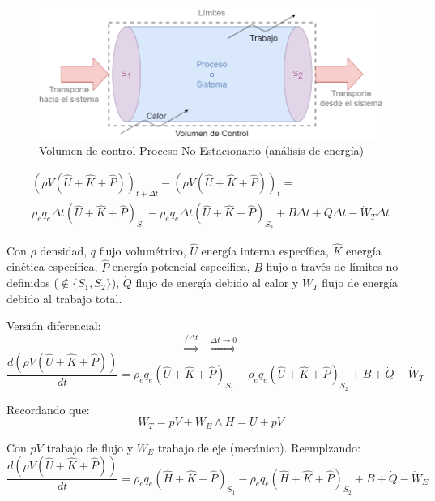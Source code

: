     \begin{figure}
        \centering
        \includegraphics[width=.73\textwidth]{img/esquemas/balance_energia_ns.png}
        \caption{Volumen de control Proceso No Estacionario (análisis de energía)}
        \label{fig:vol_control_en_n_s}
    \end{figure}
    \begin{equation}
    \label{eq:be_no_s}
        \begin{matrix}
             \left ( \rho V \left ( \widehat{U} +\widehat{K} + \widehat{P} \right ) \right )_{t + \Delta t} - \left ( \rho V \left ( \widehat{U} +\widehat{K} + \widehat{P} \right ) \right )_{t} = \\
             \rho_{e} q_{e} \Delta t \left ( \widehat{U} +\widehat{K} + \widehat{P} \right )_{S_{1}} - \rho_{e} q_{e} \Delta t \left ( \widehat{U} +\widehat{K} + \widehat{P} \right )_{S_{2}} + B \Delta t + \dot{Q} \Delta t - \dot{W}_{T} \Delta t
        \end{matrix}
    \end{equation}
    
    Con \(\rho\) densidad, \(q\) flujo volumétrico, \(\widehat{U}\) energía interna específica, \(\widehat{K}\) energía cinética específica, \(\widehat{P}\) energía potencial específica, \(B\) flujo a través de límites no definidos (\(\notin \{ S_{1}, S_{2} \} \)), \(\dot{Q}\) flujo de energía debido al calor y \(\dot{W}_{T}\) flujo de energía debido al trabajo total.
    
    Versión diferencial:
    \[\overset{/\Delta t}{\Rightarrow}\;\;\overset{\Delta t \rightarrow 0}{\Rightarrow}\]
    \[\frac{d \left ( \rho V \left ( \widehat{U} +\widehat{K} + \widehat{P} \right ) \right )}{dt} = \rho_{e} q_{e} \left ( \widehat{U} +\widehat{K} + \widehat{P} \right )_{S_{1}} - \rho_{e} q_{e} \left ( \widehat{U} +\widehat{K} + \widehat{P} \right )_{S_{2}} + B + \dot{Q} - \dot{W}_{T}\]
    
    Recordando que:
    \[W_{T} = pV + W_{E} \wedge H = U + pV\]
    
    Con \(pV\) trabajo de flujo y \(W_{E}\) trabajo de eje (mecánico). Reemplzando:
    \begin{equation}
    \label{eq:be_no_s_diff}
        \frac{d \left ( \rho V \left ( \widehat{U} +\widehat{K} + \widehat{P} \right ) \right )}{dt} = \rho_{e} q_{e} \left ( \widehat{H} +\widehat{K} + \widehat{P} \right )_{S_{1}} - \rho_{e} q_{e} \left ( \widehat{H} +\widehat{K} + \widehat{P} \right )_{S_{2}} + B + \dot{Q} - \dot{W}_{E}
    \end{equation}
        
